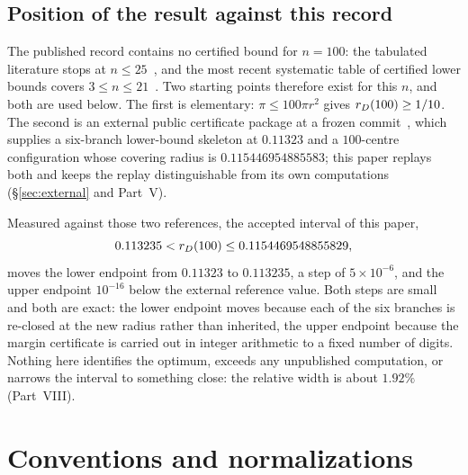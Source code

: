 \subsection{Position of the result against this record}

The published record contains no certified bound for $n=100$: the tabulated literature stops at
$n\le25$~\cite{friedman-circovcir,leapsinbounds}, and the most recent systematic table of certified
lower bounds covers $3\le n\le21$~\cite{barria2026}. Two starting points therefore exist for this
$n$, and both are used below. The first is elementary: $\pi\le100\pi r^{2}$ gives
$r_{D}(100)\ge1/10$. The second is an external public certificate package at a frozen
commit~\cite{external67ebf1c}, which supplies a six-branch lower-bound skeleton at $0.11323$ and a
$100$-centre configuration whose covering radius is $0.115446954885583$; this paper replays both and
keeps the replay distinguishable from its own computations (\S\ref{sec:external} and Part~V).

Measured against those two references, the accepted interval of this paper,
\[
0.113235<r_{D}(100)\le0.1154469548855829 ,
\]
moves the lower endpoint from $0.11323$ to $0.113235$, a step of $5\times10^{-6}$, and the upper
endpoint $10^{-16}$ below the external reference value. Both steps are small and both are exact: the
lower endpoint moves because each of the six branches is re-closed at the new radius rather than
inherited, the upper endpoint because the margin certificate is carried out in integer arithmetic to
a fixed number of digits. Nothing here identifies the optimum, exceeds any unpublished computation,
or narrows the interval to something close: the relative width is about $1.92\%$ (Part~VIII).

\section{Conventions and normalizations}

